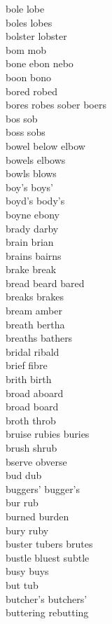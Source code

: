 bole lobe\\
boles lobes\\
bolster lobster\\
bom mob\\
bone ebon nebo\\
boon bono\\
bored robed\\
bores robes sober boers\\
bos sob\\
boss sobs\\
bowel below elbow\\
bowels elbows\\
bowls blows\\
boy's boys'\\
boyd's body's\\
boyne ebony\\
brady darby\\
brain brian\\
brains bairns\\
brake break\\
bread beard bared\\
breaks brakes\\
bream amber\\
breath bertha\\
breaths bathers\\
bridal ribald\\
brief fibre\\
brith birth\\
broad aboard \\
broad board\\
broth throb\\
bruise rubies buries\\
brush shrub\\
bserve obverse \\
bud dub\\
buggers' bugger's\\
bur rub\\
burned burden\\
bury ruby\\
buster tubers brutes\\
bustle bluest subtle\\
busy buys\\
but tub\\
butcher's butchers'\\
buttering rebutting\\

